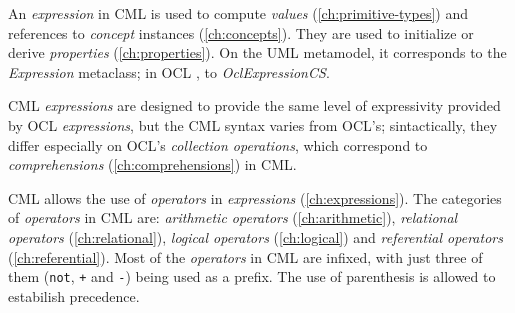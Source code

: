 An \emph{expression} in CML is used to compute
\emph{values} (\ref{ch:primitive-types})
and references to \emph{concept} instances (\ref{ch:concepts}).
They are used to initialize or derive \emph{properties} (\ref{ch:properties}).
On the UML \cite{uml} metamodel,
it corresponds to the \emph{Expression} metaclass;
in OCL \cite{ocl}, to \emph{OclExpressionCS}.

CML \emph{expressions} are designed to provide the same level of
expressivity provided by OCL \emph{expressions},
but the CML syntax varies from OCL's;
sintactically, they differ especially on OCL's \emph{collection operations},
which correspond to \emph{comprehensions} (\ref{ch:comprehensions}) in CML.

CML allows the use of \emph{operators} in \emph{expressions} (\ref{ch:expressions}).
The categories of \emph{operators} in CML are:
\emph{arithmetic operators} (\ref{ch:arithmetic}),
\emph{relational operators} (\ref{ch:relational}),
\emph{logical operators} (\ref{ch:logical})
and \emph{referential operators} (\ref{ch:referential}).
Most of the \emph{operators} in CML are infixed,
with just three of them (\verb|not|, \verb|+| and \verb|-|) being used as a prefix.
The use of parenthesis is allowed to estabilish precedence.
